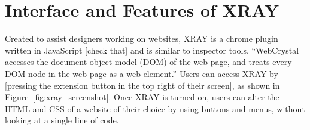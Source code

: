 \documentclass{sigchi}
\newcommand{\xray}{XRAY\xspace}
\begin{document}





\section{Interface and Features of XRAY}
Created to assist designers working on websites, \xray is a chrome plugin written in JavaScript [check that] and is similar to inspector tools. ``WebCrystal accesses the document object model (DOM) of the web page, and treats every DOM node in the web page as a web element.'' Users can access \xray by [pressing the extension button in the top right of their screen], as shown in Figure~\ref{fig:xray_screenshot}. Once \xray is turned on, users can alter the HTML and CSS of a website of their choice by using buttons and menus, without looking at a single line of code. 
\end{document}
